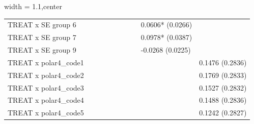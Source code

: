 \begin{table}[H]
\begin{adjustbox}{width = 1.1\textwidth,center}
\begin{tabular}{llllllllll}
 TREAT x SE group 6                                                                                                         &                    &                     &                    &                     &                    &                    &                    & 0.0606* (0.0266)   &                    \\
 TREAT x SE group 7                                                                                                         &                    &                     &                    &                     &                    &                    &                    & 0.0978* (0.0387)   &                    \\
 TREAT x SE group 9                                                                                                         &                    &                     &                    &                     &                    &                    &                    & -0.0268 (0.0225)   &                    \\
 TREAT x polar4\_code1                                                                                                                &                    &                     &                    &                     &                    &                    &                    &                    & 0.1476 (0.2836)    \\
 TREAT x polar4\_code2                                                                                                                &                    &                     &                    &                     &                    &                    &                    &                    & 0.1769 (0.2833)    \\
 TREAT x polar4\_code3                                                                                                                &                    &                     &                    &                     &                    &                    &                    &                    & 0.1527 (0.2832)    \\
 TREAT x polar4\_code4                                                                                                                &                    &                     &                    &                     &                    &                    &                    &                    & 0.1488 (0.2836)    \\
 TREAT x polar4\_code5                                                                                                                &                    &                     &                    &                     &                    &                    &                    &                    & 0.1242 (0.2827)    \\

\end{tabular}
\end{adjustbox}
\end{table}
